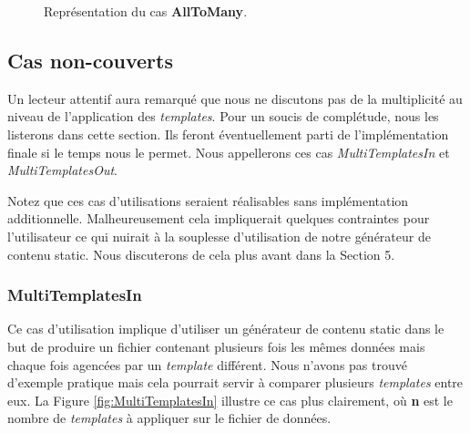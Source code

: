 			\begin{figure}
				\begin{center}
					\caption{Représentation du cas \textbf{AllToMany}.}
					\label{fig:AllToMany}
				\end{center}
			\end{figure}
		
		\subsection{Cas non-couverts}
			Un lecteur attentif aura remarqué que nous ne discutons pas de la multiplicité au niveau de l'application des \textit{templates}. Pour un soucis de complétude, nous les listerons dans cette section. Ils feront éventuellement parti de l'implémentation finale si le temps nous le permet. Nous appellerons ces cas \textit{MultiTemplatesIn} et \textit{MultiTemplatesOut}.
			
			 Notez que ces cas d'utilisations seraient réalisables sans implémentation additionnelle. Malheureusement cela impliquerait quelques contraintes pour l'utilisateur ce qui nuirait à la souplesse d'utilisation de notre générateur de contenu static. Nous discuterons de cela plus avant dans la Section 5.
			
			\subsubsection*{MultiTemplatesIn}
				Ce cas d'utilisation implique  d'utiliser un générateur de contenu static dans le but de produire un fichier contenant plusieurs fois les mêmes données mais chaque fois agencées par un \textit{template} différent. Nous n'avons pas trouvé d'exemple pratique mais cela pourrait servir à comparer plusieurs \textit{templates} entre eux. La Figure \ref{fig:MultiTemplatesIn} illustre ce cas plus clairement, où \textbf{n} est le nombre de \textit{templates} à appliquer sur le fichier de données.
				
